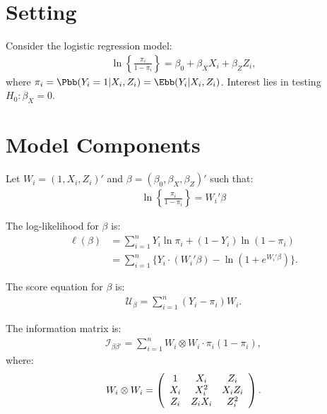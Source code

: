 




\section{Setting}
Consider the logistic regression model:
\begin{align*}
\ln\left\{\frac{\pi_{i}}{1 - \pi_{i}}\right\} = \beta_{0} + \beta_{X}X_{i} + \beta_{Z}Z_{i},
\end{align*}
where $\pi_{i} = \Pbb(Y_{i} = 1 | X_{i}, Z_{i}) = \Ebb(Y_{i} | X_{i}, Z_{i})$. Interest lies in testing $H_{0}: \beta_{X} = 0$. 

\section{Model Components}
Let $W_{i} = (1, X_{i}, Z_{i})'$ and $\beta = (\beta_{0}, \beta_{X}, \beta_{Z})'$ such that:
\begin{align*}
\ln\left\{\frac{\pi_{i}}{1 - \pi_{i}}\right\} = W_{i}'\beta
\end{align*}

The log-likelihood for $\beta$ is:
\begin{align*}
\ell(\beta) &= \sum_{i=1}^{n}Y_{i} \ln \pi_{i} + (1 - Y_{i}) \ln (1 - \pi_{i}) \\
&= \sum_{i=1}^{n} \big\{ Y_{i}\cdot (W_{i}'\beta) - \ln(1 + e^{W_{i}'\beta}) \big\}.
\end{align*}

The score equation for $\beta$ is:
\begin{align*}
\mathcal{U}_{\beta} = \sum_{i=1}^{n}(Y_{i} - \pi_{i})W_{i}.
\end{align*}

The information matrix is:
\begin{align*}
\mathcal{I}_{\beta\beta'} = \sum_{i=1}^{n}W_{i} \otimes W_{i} \cdot \pi_{i}(1 - \pi_{i}),
\end{align*}
where:
\begin{align*}
W_{i} \otimes W_{i} = \left(
\begin{array}{c c c}
1 & X_{i} & Z_{i} \\
X_{i} & X_{i}^2 & X_{i}Z_{i} \\
Z_{i} & Z_{i}X_{i} & Z_{i}^{2}
\end{array}
\right).
\end{align*}


